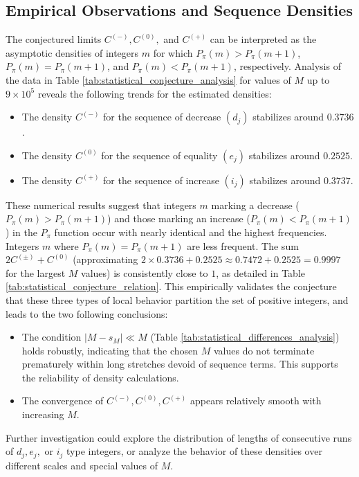 \documentclass[]{article}
\theoremstyle{plain}%
\theoremstyle{definition}
\theoremstyle{remark}
\begin{document}
	\subsection{Empirical Observations and Sequence Densities}
	The conjectured limits $C^{(-)}, C^{(0)},$ and $C^{(+)}$ can be interpreted as the asymptotic densities of integers $m$ for which $P_{\pi}(m) > P_{\pi}(m+1)$, $P_{\pi}(m) = P_{\pi}(m+1)$, and $P_{\pi}(m) < P_{\pi}(m+1)$, respectively.
	Analysis of the data in Table \ref{tab:statistical_conjecture_analysis} for values of $M$ up to $9 \times 10^5$ reveals the following trends for the estimated densities:
	\begin{itemize}
		\item The density $C^{(-)}$ for the sequence of decrease $(d_j)$ stabilizes around $0.3736$.
		\item The density $C^{(0)}$ for the sequence of equality $(e_j)$ stabilizes around $0.2525$.
		\item The density $C^{(+)}$ for the sequence of increase $(i_j)$ stabilizes around $0.3737$.
	\end{itemize}
	These numerical results suggest that integers $m$ marking a decrease ($P_{\pi}(m) > P_{\pi}(m+1)$) and those marking an increase ($P_{\pi}(m) < P_{\pi}(m+1)$) in the $P_{\pi}$ function occur with nearly identical and the highest frequencies. Integers $m$ where $P_{\pi}(m) = P_{\pi}(m+1)$ are less frequent. The sum $2C^{(\pm)} + C^{(0)}$ (approximating $2 \times 0.3736 + 0.2525 \approx 0.7472 + 0.2525 = 0.9997$ for the largest $M$ values) is consistently close to $1$, as detailed in Table \ref{tab:statistical_conjecture_relation}. This empirically validates the conjecture that these three types of local behavior partition the set of positive integers, and leads to the two following conclusions:
	\begin{itemize}
		\item The condition $|M-s_M| \ll M$ (Table \ref{tab:statistical_differences_analysis}) holds robustly, indicating that the chosen $M$ values do not terminate prematurely within long stretches devoid of sequence terms. This supports the reliability of density calculations.
		\item The convergence of $C^{(-)}, C^{(0)}, C^{(+)}$ appears relatively smooth with increasing $M$.
	\end{itemize}
	Further investigation could explore the distribution of lengths of consecutive runs of $d_j, e_j,$ or $i_j$ type integers, or analyze the behavior of these densities over different scales and special values of $M$.
	
\end{document}
